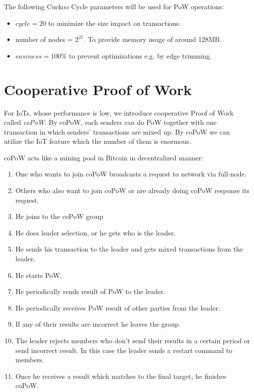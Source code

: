 \documentclass[a4paper,10pt,twocolumn]{article}
\begin{document}
The following Cuckoo Cycle parameters will be used for PoW operations:

\begin{itemize}
	\item \(cycle = 20\) to minimize the size impact on transactions.
    \item number of nodes = \( 2^{25} \). To provide memory usage of around 128MB.
    \item \(easiness = 100\% \) to prevent optimizations e.g. by edge trimming.
\end{itemize}

\section{Cooperative Proof of Work}
\label{sec:copow}

For IoTs, whose performance is low, we introduce cooperative Proof of Work called \emph{coPoW}.
By coPoW, each senders can do PoW together with one transaction in which  senders' transactions are mixed up.
By coPoW we can utilize the IoT feature which the number of them is enormous.

coPoW acts like a mining pool in Bitcoin in decentralized manner:

\vspace{-0.5\baselineskip}
\begin{enumerate}
	\setlength\itemsep{0em}
	\item One who wants to join coPoW broadcasts a request to network via full-node.
	\item Others who also want to join coPoW or are already doing coPoW response its request.
	\item He joins to the coPoW group
	\item He does leader selection, or he gets who is the leader.
	\item He sends his transaction to the leader and gets mixed transactions from the leader.
	\item He starts PoW.
	\item He periodically sends result of PoW to the leader.
	\item He periodically receives PoW result of other parties from the leader. 
	\item If any of their results are incorrect he leaves the group.
	\item The leader rejects members who don't send their results in a certain period or send incorrect result. In this case the leader
	sends a restart command to members.
	\item Once he receives a result which matches to the final target, he finishes coPoW.
\end{enumerate}
\end{document}
